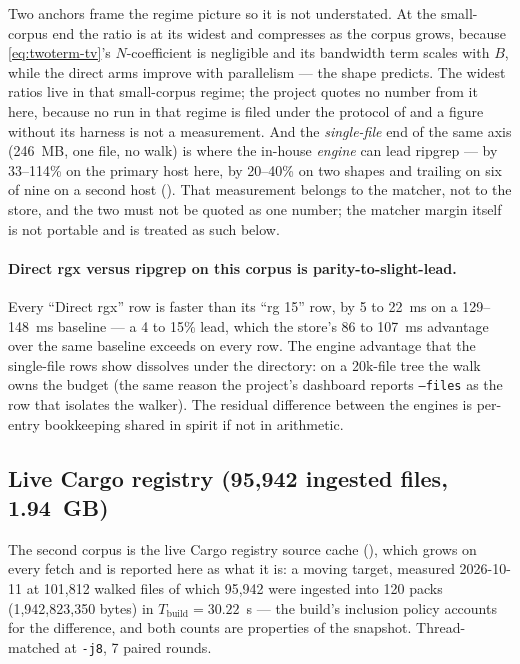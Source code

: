\documentclass[11pt,letterpaper]{article}
\begin{document}
Two anchors frame the regime picture so it is not
understated. At the small-corpus end the ratio is at its widest and
compresses as the corpus grows, because \eqref{eq:twoterm-tv}'s
$N$-coefficient is negligible and its bandwidth term scales with $B$, while
the direct arms improve
with parallelism --- the shape  predicts. The
widest ratios live in that small-corpus regime; the project quotes no
number from it here, because no run in that regime is filed under the
protocol of  and a figure without its harness is not a
measurement. And the
\emph{single-file} end of the same axis (246~MB, one file, no walk) is
where the in-house \emph{engine} can lead ripgrep --- by 33--114\% on the
primary host here, by 20--40\% on two shapes and trailing on six of nine
on a second host (). That measurement belongs to the
matcher, not to the store, and the two must not be quoted as one number;
the matcher margin itself is not portable and is treated as such below.

\paragraph{Direct rgx versus ripgrep on this corpus is parity-to-slight-lead.}
Every ``Direct rgx'' row is faster than its ``rg 15'' row, by 5 to 22~ms on a
129--148~ms baseline --- a 4 to 15\% lead, which the store's 86 to 107~ms
advantage over the same baseline exceeds on every row. The
engine advantage that the single-file rows show dissolves under the
directory: on a 20k-file tree the walk owns the budget (the same reason the
project's dashboard reports \texttt{--files} as the row that isolates the
walker). The residual difference between the engines is per-entry
bookkeeping shared in spirit if not in arithmetic.

\subsection{Live Cargo registry (95{,}942 ingested files, 1.94~GB)}
\label{sec:eval:cargo}
The second corpus is the live Cargo registry source cache
(), which grows on every fetch and is reported
here as what it is: a moving target, measured 2026-10-11 at 101{,}812
walked files of which 95{,}942 were ingested into 120 packs
(1{,}942{,}823{,}350 bytes) in $T_{\text{build}} = 30.22$~s --- the build's
inclusion policy accounts for the difference, and both counts are
properties of the snapshot. Thread-matched
at \texttt{-j8}, 7 paired rounds.
\end{document}
